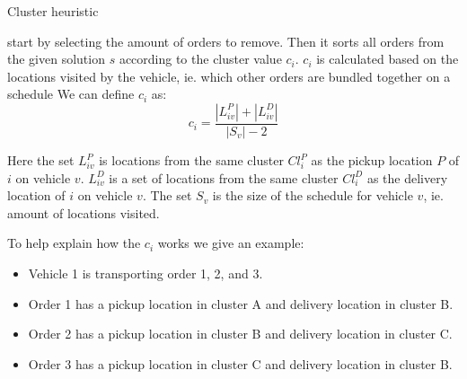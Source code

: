\documentclass[../main.tex]{subfiles}
\begin{document}
\begin{algorithm}
    \caption{Cluster heuristic}\label{alg:cluster}
    \begin{algorithmic}[1]
        $, $p$}
        \State select the number of orders to reinsert $q$
        \State add orders to array A acending based on cluster value $c_i$
        \State empty order set $I$
        \Repeat
            \State choose a random number $y$ between $[0,1]$
            \State remove the order in position $y^p$ in $A$ from $s$ 
            \State add removed order to $I$
        \Until {$|I| = q$}
        \For{$i\in I$}
            \State find vehicle schedule $S_v$ which maximizes $c_i$
            \State insert $i$ in best possible position in $S_v$
            \State update $s$ based on $S_v$
        \EndFor
        \State
        \Return $s$
        \EndFunction
    \end{algorithmic}
\end{algorithm}

 start by selecting the amount of orders to remove. Then it sorts all orders from the given solution $s$ according to the cluster value $c_i$. $c_i$ is calculated based on the locations visited by the vehicle, ie. which other orders are bundled together on a schedule
We can define $c_i$ as:
\begin{equation}
    c_i = \dfrac{|L^P_{iv}|+|L^D_{iv}|}{|S_v|-2}
\end{equation}

Here the set $L^P_{iv}$ is locations from the same cluster $Cl^P_i$ as the pickup location $P$ of $i$ on vehicle $v$. 
$L^D_{iv}$ is a set of locations from the same cluster $Cl^D_i$ as the delivery location of $i$ on vehicle $v$. 
The set $S_v$ is the size of the schedule for vehicle $v$, ie. amount of locations visited. \par

To help explain how the $c_i$ works we give an example:
\begin{itemize}
    \item Vehicle 1 is transporting order 1, 2, and 3.
    \item Order 1 has a pickup location in cluster A and delivery location in cluster B.
    \item Order 2 has a pickup location in cluster B and delivery location in cluster C.
    \item Order 3 has a pickup location in cluster C and delivery location in cluster B.
\end{itemize}
\end{document}

